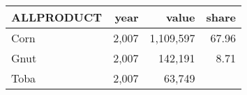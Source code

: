\documentclass[]{article}
\begin{document}
\begin{longtable}[]{@{}lrrr@{}}
\toprule
\begin{minipage}[b]{0.16\columnwidth}\raggedright\strut
ALLPRODUCT\strut
\end{minipage} & \begin{minipage}[b]{0.09\columnwidth}\raggedleft\strut
year\strut
\end{minipage} & \begin{minipage}[b]{0.12\columnwidth}\raggedleft\strut
value\strut
\end{minipage} & \begin{minipage}[b]{0.09\columnwidth}\raggedleft\strut
share\strut
\end{minipage}\tabularnewline
\midrule
\endhead
\begin{minipage}[t]{0.16\columnwidth}\raggedright\strut
Corn\strut
\end{minipage} & \begin{minipage}[t]{0.09\columnwidth}\raggedleft\strut
2,007\strut
\end{minipage} & \begin{minipage}[t]{0.12\columnwidth}\raggedleft\strut
1,109,597\strut
\end{minipage} & \begin{minipage}[t]{0.09\columnwidth}\raggedleft\strut
67.96\strut
\end{minipage}\tabularnewline
\begin{minipage}[t]{0.16\columnwidth}\raggedright\strut
Gnut\strut
\end{minipage} & \begin{minipage}[t]{0.09\columnwidth}\raggedleft\strut
2,007\strut
\end{minipage} & \begin{minipage}[t]{0.12\columnwidth}\raggedleft\strut
142,191\strut
\end{minipage} & \begin{minipage}[t]{0.09\columnwidth}\raggedleft\strut
8.71\strut
\end{minipage}\tabularnewline
\begin{minipage}[t]{0.16\columnwidth}\raggedright\strut
Toba\strut
\end{minipage} & \begin{minipage}[t]{0.09\columnwidth}\raggedleft\strut
2,007\strut
\end{minipage} & \begin{minipage}[t]{0.12\columnwidth}\raggedleft\strut
63,749\strut
\end{minipage} & \begin{minipage}[t]{0.09\columnwidth}\raggedleft\strut

\end{minipage}
\end{longtable}
\end{document}
